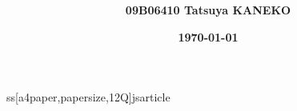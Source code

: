 ss[a4paper,papersize,12Q]{jsarticle}
\usepackage[T1]{fontenc}
\usepackage[utf8]{inputenc}
\usepackage{lmodern}
\usepackage[sc]{mathpazo}
\usepackage[scaled]{helvet}
\usepackage[scaled]{beramono}
\usepackage[dvipdfmx]{emathP}
\setlength{\textheight}{47\baselineskip+\topskip}
\setlength{\topmargin}{(297truemm-\textheight)/2-1truein-1truecm}
\setlength{\textwidth}{47zw}
\setlength{\oddsidemargin}{(210truemm-\textwidth)/2-1truein}
\let\MARU\relax
\usepackage[deluxe,expert]{otf}
\usepackage{textcomp,okumacro}
\renewcommand{\headfont}{\sffamily\bfseries}
\author{\headfont 09B06410 Tatsuya KANEKO}
\title{\headfont}
\date{\headfont\today}

\maketitle






